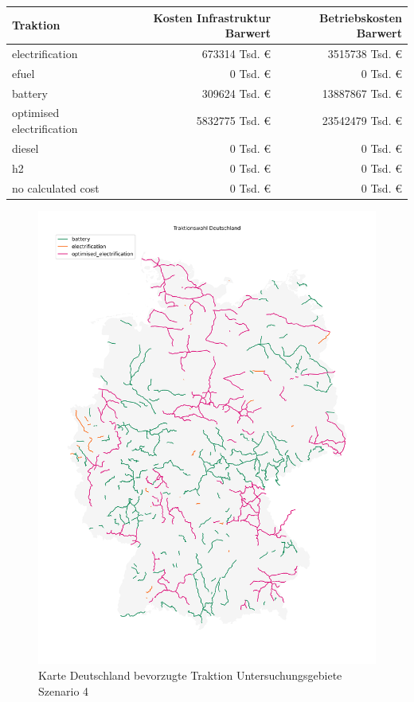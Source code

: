 \begin{center}
	\begin{tabularx}{\textwidth}{X | r | r} Traktion & Kosten Infrastruktur Barwert & Betriebskosten Barwert\\
	\hline
            electrification & \num{673314} Tsd. € &  \num{3515738} Tsd. €\\
            efuel & \num{0} Tsd. € &  \num{0} Tsd. €\\
            battery & \num{309624} Tsd. € &  \num{13887867} Tsd. €\\
            optimised electrification & \num{5832775} Tsd. € &  \num{23542479} Tsd. €\\
            diesel & \num{0} Tsd. € &  \num{0} Tsd. €\\
            h2 & \num{0} Tsd. € &  \num{0} Tsd. €\\
            no calculated cost & \num{0} Tsd. € &  \num{0} Tsd. €\\
    	\end{tabularx}
\end{center}

\begin{center}
	\begin{figure}[!h]
	\includegraphics[height=0.8\paperheight]{../report_scenarios/s_4/files/deutschland_map.png}
	\caption{\label{fig_s_4_d_map} Karte Deutschland bevorzugte Traktion Untersuchungsgebiete Szenario 4}
	\end{figure}
\end{center}